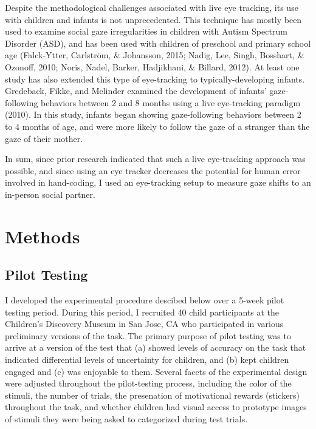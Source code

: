 \documentclass[,man,floatsintext]{apa6}
\begin{document}
Despite the methodological challenges associated with live eye tracking, its use with children and infants is not unprecedented. This technique has mostly been used to examine social gaze irregularities in children with Autism Spectrum Disorder (ASD), and has been used with children of preschool and primary school age (Falck-Ytter, Carlström, \& Johansson, 2015; Nadig, Lee, Singh, Bosshart, \& Ozonoff, 2010; Noris, Nadel, Barker, Hadjikhani, \& Billard, 2012). At least one study has also extended this type of eye-tracking to typically-developing infants. Gredeback, Fikke, and Melinder examined the development of infants' gaze-following behaviors between 2 and 8 months using a live eye-tracking paradigm (2010). In this study, infants began showing gaze-following behaviors between 2 to 4 months of age, and were more likely to follow the gaze of a stranger than the gaze of their mother.

In sum, since prior research indicated that such a live eye-tracking approach was possible, and since using an eye tracker decreases the potential for human error involved in hand-coding, I used an eye-tracking setup to measure gaze shifts to an in-person social partner.

\hypertarget{methods}{%
\section{Methods}\label{methods}}

\hypertarget{pilot-testing}{%
\subsection{Pilot Testing}\label{pilot-testing}}

I developed the experimental procedure descibed below over a 5-week pilot testing period. During this period, I recruited 40 child participants at the Children's Discovery Museum in San Jose, CA who participated in various preliminary versions of the task. The primary purpose of pilot testing was to arrive at a version of the test that (a) showed levels of accuracy on the task that indicated differential levels of uncertainty for children, and (b) kept children engaged and (c) was enjoyable to them. Several facets of the experimental design were adjusted throughout the pilot-testing process, including the color of the stimuli, the number of trials, the presenation of motivational rewards (stickers) throughout the task, and whether children had visual access to prototype images of stimuli they were being asked to categorized during test trials.
\end{document}
